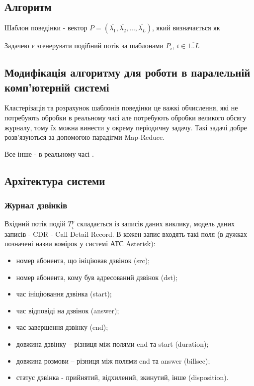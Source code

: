     \subsection{Алгоритм}

  Шаблон поведінки - вектор $P = (\overline{\lambda_1}, \overline{\lambda_2}, \dots, \overline{\lambda_L})$, який визначається як 

Задачею є згенерувати подібний потік за шаблонами $P_i$, $i \in \overline{1..L} $

	\subsection{Модифікація алгоритму для роботи в паралельній комп'ютерній системі}

	Кластерізація та розрахунок шаблонів поведінки це важкі обчислення, які не потребують обробки в реальному часі але потребують обробки великого обсягу журналу, тому їх можна винести у окрему періодичну задачу. Такі задачі добре розв'язуються за допомогою парадігми Map-Reduce.

	Все інше - в реальному часі \TBD.

\subsection{Архітектура системи}

\subsubsection{Журнал дзвінків}
  Вхідний потік подій ${T_i^p}$ складається із записів даних виклику, модель даних записів - CDR - Call Detail Record. В кожен запис входять такі поля (в дужках позначені назви комірок у системі АТС Asterisk):

   \begin{itemize}
    \item номер абонента, що ініціював дзвінок (src);
    \item номер абонента, кому був адресований дзвінок (dst);
    \item час ініціювання дзвінка (start);
    \item час відповіді на дзвінок (answer);
    \item час завершення дзвінку (end);
    \item довжина дзвінку -- різниця між полями end та start (duration);
    \item довжина розмови -- різниця між полями end та answer (billsec);
    \item статус дзвінка - прийнятий, відхилений, зкинутий, інше (disposition).
  \end{itemize}

